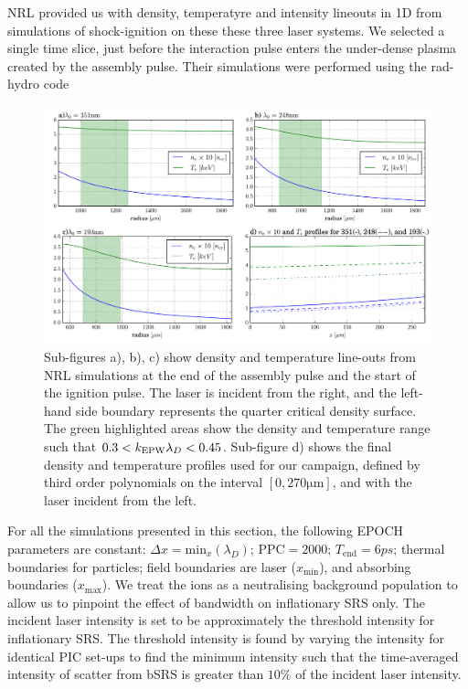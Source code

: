 NRL provided us with density, temperatyre and intensity lineouts in 1D from simulations of shock-ignition on these these three laser systems. We selected a single time slice, just before the interaction pulse enters the under-dense plasma created by the assembly pulse. Their simulations were performed using the rad-hydro code 

\begin{figure}[ht]
   \centering
    \includegraphics[width=\columnwidth]{Chapters/C5_broadband/a_b_c_d_Dens_temp.pdf}
    \caption{Sub-figures a), b), c) show density and temperature line-outs from NRL simulations at the end of the assembly pulse and the start of the ignition pulse. The laser is incident from the right, and the left-hand side boundary represents the quarter critical density surface. The green highlighted areas show the density and temperature range such that $0.3<k_\mathrm{EPW}\lambda_D<0.45$. Sub-figure d) shows the final density and temperature profiles used for our campaign, defined by third order polynomials on the interval $[0,270\si{\micro\metre}]$, and with the laser incident from the left.}
    \label{fig:dens_temp}
\end{figure}{}


For all the simulations presented in this section, the following EPOCH parameters are constant: $\Delta x = \mathrm{min}_x(\lambda_D)$; $\mathrm{PPC} = 2000$; $T_{\mathrm{end}}=6\si{ps}$; thermal boundaries for particles; field boundaries are laser ($x_{\mathrm{min}}$), and absorbing boundaries ($x_{\mathrm{max}}$). We treat the ions as a neutralising background population to allow us to pinpoint the effect of bandwidth on inflationary SRS only. The incident laser intensity is set to be approximately the threshold intensity for inflationary SRS. The threshold intensity is found by varying the intensity for identical PIC set-ups to find the minimum intensity such that the time-averaged intensity of scatter from bSRS is greater than $10\%$ of the incident laser intensity. 

